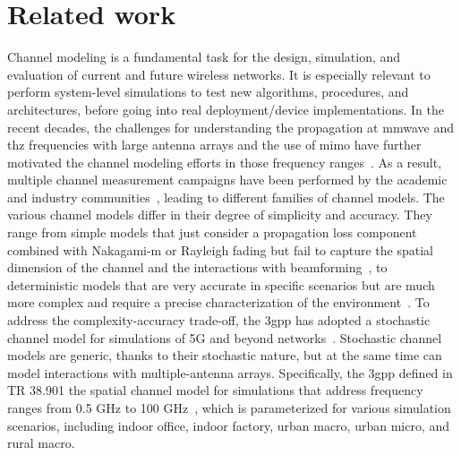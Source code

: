 \section{Related work}
\label{sec:rel_work}
Channel modeling is a fundamental task for the design, simulation, and evaluation of current and future wireless networks. It is especially relevant to perform system-level simulations to test new algorithms, procedures, and architectures, before going into real deployment/device implementations. In the recent decades, the challenges for understanding the propagation at \gls{mmwave} and \gls{thz} frequencies with large antenna arrays and the use of \gls{mimo} have further motivated the channel modeling efforts in those frequency ranges~\cite{hemadeh2018millimeter, 9444237}. As a result, multiple channel measurement campaigns have been performed by the academic and industry communities~\cite{rappaport2013millimeter}, 
leading to different families of channel models. The various channel models differ in their degree of simplicity and accuracy. 
They range from simple models that just consider a propagation loss component combined with Nakagami-m or Rayleigh fading but fail to capture the spatial dimension of the channel and the interactions with beamforming~\cite{andrews2017modeling}, to deterministic models that are very accurate in specific scenarios but are much more complex and require a precise characterization of the environment~\cite{lecci2020simplified}.
To address the complexity-accuracy trade-off, the \gls{3gpp} has adopted a stochastic channel model for simulations of 5G and beyond networks~\cite{TR38901}. Stochastic channel models are generic, thanks to their stochastic nature, but at the same time can model interactions with multiple-antenna arrays.
Specifically, the \gls{3gpp} defined in TR 38.901 the spatial channel model for simulations that address frequency ranges from 0.5 GHz to 100 GHz~\cite{TR38901}, which is parameterized for various simulation scenarios, including indoor office, indoor factory, urban macro, urban micro, and rural macro. 

